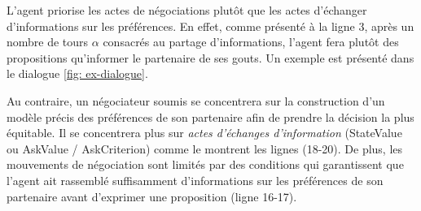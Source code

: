 	L'agent priorise les actes de négociations plutôt que les actes d'échanger d'informations sur les préférences. En effet, comme présenté à la ligne 3, après un nombre de tours $ \alpha $ consacrés au partage d'informations, l'agent fera plutôt des propositions qu'informer le partenaire de ses gouts. Un exemple est présenté dans le dialogue \ref{fig: ex-dialogue}.
	
	Au contraire, un négociateur soumis se concentrera sur la construction d'un modèle précis des préférences de son partenaire afin de prendre la décision la plus équitable. Il se concentrera plus sur \emph {actes d'échanges d'information} (StateValue ou AskValue / AskCriterion) comme le montrent les lignes (18-20). De plus, les mouvements de négociation sont limités par des conditions qui garantissent que l'agent ait rassemblé suffisamment d'informations sur les préférences de son partenaire avant d'exprimer une proposition (ligne 16-17).
	
	
	
